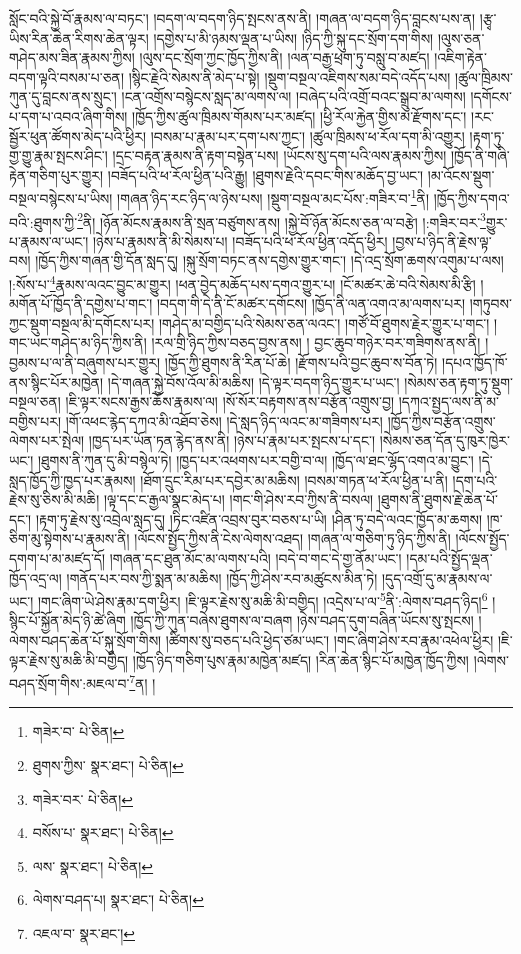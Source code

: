 སློང་བའི་སྐྱེ་བོ་རྣམས་ལ་བཏང་། །བདག་ལ་བདག་ཉིད་སྤངས་ནས་ནི། །གཞན་ལ་བདག་ཉིད་བླངས་པས་ན། །རྩྭ་ཡིས་རིན་ཆེན་རིགས་ཆེན་ལྟར། །དགྱེས་པ་མི་ཉམས་ལྡན་པ་ཡིས། །ཉིད་ཀྱི་སྐུ་དང་སྲོག་དག་གིས། །ལུས་ཅན་གཤེད་མས་ཟིན་རྣམས་ཀྱིས། །ལུས་དང་སྲོག་ཀྱང་ཁྱོད་ཀྱིས་ནི། །ལན་བརྒྱ་ཕྲག་ཏུ་བསླུ་བ་མཛད། །འཇིག་རྟེན་བདག་ལྟའི་བསམ་པ་ཅན། །སྙིང་རྗེའི་སེམས་ནི་མེད་པ་སྟེ། །སྡུག་བསྔལ་འཇིགས་སམ་བདེ་འདོད་པས། །ཚུལ་ཁྲིམས་ཀུན་དུ་བླངས་ནས་སྲུང་། །ངན་འགྲོས་བསྙེངས་སླད་མ་ལགས་ལ། །བཞེད་པའི་འགྲོ་བའང་སྒྲུབ་མ་ལགས། །དགོངས་པ་དག་པ་འབའ་ཞིག་གིས། །ཁྱོད་ཀྱིས་ཚུལ་ཁྲིམས་གོམས་པར་མཛད། །ཕྱི་རོལ་རྐྱེན་གྱིས་མ་རྫོགས་དང་། །རང་སྦྱོར་ཕུན་ཚོགས་མེད་པའི་ཕྱིར། །བསམ་པ་རྣམ་པར་དག་པས་ཀྱང་། །ཚུལ་ཁྲིམས་ཕ་རོལ་དག་མི་འགྱུར། །རྟག་ཏུ་གྱ་གྱུ་རྣམ་སྤངས་ཤིང་། །དྲང་བརྟན་རྣམས་ནི་རྟག་བསྟེན་པས། །ཡོངས་སུ་དག་པའི་ལས་རྣམས་ཀྱིས། །ཁྱོད་ནི་གཞི་རྟེན་གཅིག་པུར་གྱུར། །བཟོད་པའི་ཕ་རོལ་ཕྱིན་པའི་རྒྱུ། །ཐུགས་རྗེའི་དབང་གིས་མཆོད་བྱ་ཡང་། །མ་འོངས་སྡུག་བསྔལ་བསྙེངས་པ་ཡིས། །གཞན་ཉིད་རང་ཉིད་ལ་ཉེས་པས། །སྡུག་བསྔལ་མང་པོས་:གཟིར་བ་\footnote{གཟེར་བ་  པེ་ཅིན། }ནི། །ཁྱོད་ཀྱིས་དགའ་བའི་:ཐུགས་ཀྱི་\footnote{ཐུགས་ཀྱིས་  སྣར་ཐང་།  པེ་ཅིན། }ནི། །ཉོན་མོངས་རྣམས་ནི་སྲན་བཙུགས་ནས། །སྐྱེ་བོ་ཉོན་མོངས་ཅན་ལ་བརྩེ། །:གཟིར་བར་\footnote{གཟེར་བར་  པེ་ཅིན། }གྱུར་པ་རྣམས་ལ་ཡང་། །ཉེས་པ་རྣམས་ནི་མི་སེམས་པ། །བཟོད་པའི་ཕ་རོལ་ཕྱིན་འདོད་ཕྱིར། །བྱས་པ་ཉིད་ནི་རྗེས་ལྟ་བས། །ཁྱོད་ཀྱིས་གཞན་གྱི་དོན་སླད་དུ། །སྐུ་སྲོག་བཏང་ནས་དགྱེས་གྱུར་གང་། །དེ་འདྲ་སྲོག་ཆགས་འགུམ་པ་ལས། །:སོས་པ་\footnote{བསོས་པ་  སྣར་ཐང་།  པེ་ཅིན། }རྣམས་ལའང་བྱུང་མ་གྱུར། །ཕན་བྱེད་མཆོད་པས་དགའ་གྱུར་པ། །ངོ་མཚར་ཆེ་བའི་སེམས་མི་རྩི། །མགོན་པོ་ཁྱོད་ནི་དགྱེས་པ་གང་། །བདག་གི་དེ་ནི་ངོ་མཚར་དགོངས། །ཁྱོད་ནི་ལན་འགའ་མ་ལགས་པར། །གཏུབས་ཀྱང་སྡུག་བསྔལ་མི་དགོངས་པར། །གཤེད་མ་བགྱིད་པའི་སེམས་ཅན་ལའང་། །གཙོ་བོ་ཐུགས་རྗེར་གྱུར་པ་གང་། །གང་ཡང་གཤེད་མ་ཉིད་ཀྱིས་ནི། །རལ་གྲི་ཉིད་ཀྱིས་བཅད་བྱས་ནས། །
བྱང་ཆུབ་གཉེར་བར་གཟིགས་ནས་ནི། །བྱམས་པ་ལ་ནི་བཞུགས་པར་གྱུར། །ཁྱོད་ཀྱི་ཐུགས་ནི་རིན་པོ་ཆེ། །རྫོགས་པའི་བྱང་ཆུབ་ས་བོན་ཏེ། །དཔའ་ཁྱོད་ཁོ་ནས་སྙིང་པོར་མཁྱེན། །དེ་གཞན་སྐྱེ་བོས་འོལ་མི་མཆིས། །དེ་ལྟར་བདག་ཉིད་གྱུར་པ་ཡང་། །སེམས་ཅན་རྟག་ཏུ་སྡུག་བསྔལ་ཅན། །ཇི་ལྟར་སངས་རྒྱས་ཆོས་རྣམས་ལ། །སོ་སོར་བརྟགས་ནས་བརྩོན་འགྲུས་བྱ། །དཀའ་སྤྱད་ལས་ནི་མ་བགྱིས་པར། །གོ་འཕང་རྙེད་དཀའ་མི་འཐོབ་ཅེས། །དེ་སླད་ཉིད་ལའང་མ་གཟིགས་པར། །ཁྱོད་ཀྱིས་བརྩོན་འགྲུས་ལེགས་པར་སྤེལ། །ཁྱད་པར་ཡོན་ཏན་རྙེད་ནས་ནི། །ཉེས་པ་རྣམ་པར་སྤངས་པ་དང་། །སེམས་ཅན་དོན་དུ་ཁུར་ཁྱེར་ཡང་། །ཐུགས་ནི་ཀུན་དུ་མི་བསྙེལ་ཏེ། །ཁྱད་པར་འཕགས་པར་བགྱི་བ་ལ། །ཁྱོད་ལ་ཐང་ལྷོད་འགའ་མ་བྱུང་། །དེ་སླད་ཁྱོད་ཀྱི་ཁྱད་པར་རྣམས། །ཐོག་དྲུང་རིམ་པར་དབྱེར་མ་མཆིས། །བསམ་གཏན་ཕ་རོལ་ཕྱིན་པ་ནི། །དག་པའི་རྗེས་སུ་ཅིས་མི་མཆི། །ལྟ་དང་ང་རྒྱལ་སྣང་མེད་པ། །གང་གི་ཤེས་རབ་ཀྱིས་ནི་བསལ། །ཐུགས་ནི་ཐུགས་རྗེ་ཆེན་པོ་དང་། །རྟག་ཏུ་རྗེས་སུ་འབྲེལ་སླད་དུ། །ཏིང་འཛིན་འབྲས་བུར་བཅས་པ་ཡི། །ཤིན་ཏུ་བདེ་ལའང་ཁྱོད་མ་ཆགས། །ཁ་ཅིག་མུ་སྟེགས་པ་རྣམས་ནི། །ལོངས་སྤྱོད་ཀྱིས་ནི་ངེས་ལེགས་འཐད། །གཞན་ལ་གཅིག་ཏུ་ཉིད་ཀྱིས་ནི། །ལོངས་སྤྱོད་དགག་པ་མ་མཛད་དོ། །གཞན་དང་ཐུན་མོང་མ་ལགས་པའི། །བདེ་བ་གང་དེ་གྱ་ནོམ་ཡང་། །དམ་པའི་སྤྱོད་ལྡན་ཁྱོད་འདྲ་ལ། །གནོད་པར་བས་ཀྱི་སྨན་མ་མཆིས། །ཁྱོད་ཀྱི་ཤེས་རབ་མཚུངས་མིན་ཏེ། །དུད་འགྲོ་དུ་མ་རྣམས་ལ་ཡང་། །གང་ཞིག་ཡེ་ཤེས་རྣམ་དག་ཕྱིར། །ཇི་ལྟར་རྗེས་སུ་མཆི་མི་བགྱིད། །འདྲེས་པ་ལ་\footnote{ལས་  སྣར་ཐང་།  པེ་ཅིན། }ནི་:ལེགས་བཤད་ཉིད།\footnote{ལེགས་བཤད་པ།  སྣར་ཐང་།  པེ་ཅིན། } །སྙིང་པོ་སྐྱོན་མེད་ཉི་ཚེ་ཞིག །ཁྱོད་ཀྱི་ཀུན་བཞེས་ཐུགས་ལ་བཞག །ཉེས་བཤད་དུག་བཞིན་ཡོངས་སུ་སྤངས། །ལེགས་བཤད་ཆེན་པོ་སྐུ་སྲོག་གིས། །ཚིགས་སུ་བཅད་པའི་ཕྱེད་ཙམ་ཡང་། །གང་ཞིག་ཤེས་རབ་རྣམ་འཕེལ་ཕྱིར། །ཇི་ལྟར་རྗེས་སུ་མཆི་མི་བགྱིད། །ཁྱོད་ཉིད་གཅིག་པུས་རྣམ་མཁྱེན་མཛད། །རིན་ཆེན་སྙིང་པོ་མཁྱེན་ཁྱོད་ཀྱིས། །ལེགས་བཤད་སྲོག་གིས་:མཇལ་བ་\footnote{འཇལ་བ་  སྣར་ཐང་། }ན། །
